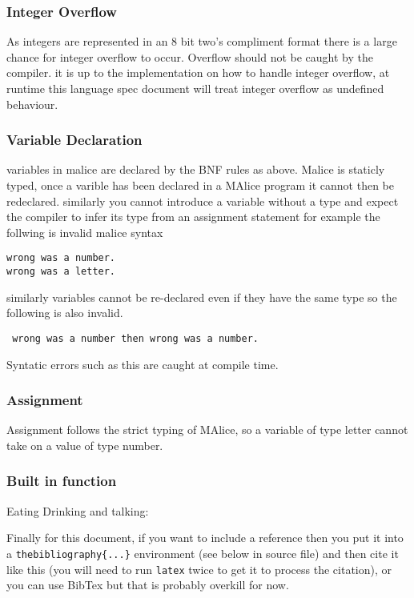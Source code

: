 \documentclass[a4wide, 10pt]{article}
\begin{document}
\subsubsection{Integer Overflow}
As integers are represented in an 8 bit two's compliment format there is a 
large chance for integer overflow to occur. Overflow should not be caught by the
compiler. it is up to the implementation on how to handle integer overflow, at 
runtime this language spec document will treat integer overflow as undefined 
behaviour.


\subsubsection{Variable Declaration}
variables in malice are declared by the BNF rules as above.
Malice is staticly typed, once a varible has been declared in a MAlice program 
it cannot then be redeclared. similarly you cannot introduce a variable without 
a type and expect the compiler to infer its type from an assignment statement for
example the follwing is invalid malice syntax

\texttt{wrong was a number.\\wrong was a letter.}

similarly variables cannot be re-declared even if they have the same type so the
following is also invalid.

\texttt{ wrong was a number then wrong was a number.}

Syntatic errors such as this are caught at compile time.


\subsubsection{Assignment}
Assignment follows the strict typing of MAlice, so a variable of type letter 
cannot take on a value of type number.


\subsubsection{Built in function}
Eating Drinking and talking: 




Finally for this document, if you want to include a reference
then you put it into a \texttt{thebibliography\{...\}}
environment (see below in source file) and then 
cite it like this \cite{lamport94}
(you will need to run \texttt{latex} twice to get it to process the citation),
or you can use BibTex but that is probably overkill for now.

\end{document}
